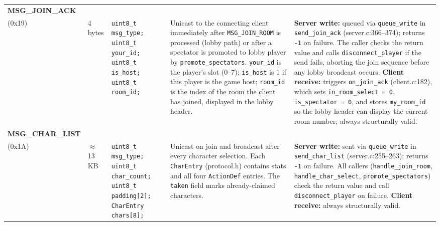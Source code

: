 \documentclass[11pt,letterpaper]{article}
\begin{document}
\begin{longtable}{@{}p{1.8cm} p{1.2cm} p{2.4cm} p{4.2cm} p{4.8cm}@{}}
\textbf{MSG\_JOIN\_ACK}\\(0x19) &
4 bytes &
\texttt{uint8\_t msg\_type;}\newline
\texttt{uint8\_t your\_id;}\newline
\texttt{uint8\_t is\_host;}\newline
\texttt{uint8\_t room\_id;} &
Unicast to the connecting client immediately after \texttt{MSG\_JOIN\_ROOM} is processed (lobby path) or after a spectator is promoted to lobby player by \texttt{promote\_spectators}. \texttt{your\_id} is the player's slot (0--7); \texttt{is\_host} is 1 if this player is the game host; \texttt{room\_id} is the index of the room the client has joined, displayed in the lobby header. &
\textbf{Server write:} queued via \texttt{queue\_write} in \texttt{send\_join\_ack} (server.c:366--374); returns \texttt{-1} on failure. The caller checks the return value and calls \texttt{disconnect\_player} if the send fails, aborting the join sequence before any lobby broadcast occurs. \textbf{Client receive:} triggers \texttt{on\_join\_ack} (client.c:182), which sets \texttt{in\_room\_select = 0}, \texttt{is\_spectator = 0}, and stores \texttt{my\_room\_id} so the lobby header can display the current room number; always structurally valid. \\[4pt]

\textbf{MSG\_CHAR\_LIST}\\(0x1A) &
$\approx$13\,KB &
\texttt{uint8\_t msg\_type;}\newline
\texttt{uint8\_t char\_count;}\newline
\texttt{uint8\_t padding[2];}\newline
\texttt{CharEntry chars[8];} &
Unicast on join and broadcast after every character selection. Each \texttt{CharEntry} (protocol.h) contains stats and all four \texttt{ActionDef} entries. The \texttt{taken} field marks already-claimed characters. &
\textbf{Server write:} sent via \texttt{queue\_write} in \texttt{send\_char\_list} (server.c:255--263); returns \texttt{-1} on failure. All callers (\texttt{handle\_join\_room}, \texttt{handle\_char\_select}, \texttt{promote\_spectators}) check the return value and call \texttt{disconnect\_player} on failure. \textbf{Client receive:} always structurally valid. \\[4pt]


\end{longtable}
\end{document}
